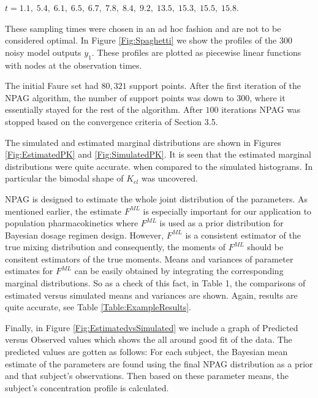 
$t = 1.1, \; 5.4, \; 6.1, \; 6.5, \; 6.7,\;  7.8, \; 8.4,  \; 9.2,\; 13.5,\; 15.3,\; 15.5,\; 15.8$.  
%

\noindent These sampling times were chosen in an ad hoc fashion and are not to be considered optimal.
In Figure  \ref{Fig:Spaghetti} we show the profiles of the 300 noisy model outputs $y_1$.
%
These profiles are plotted as piecewise linear functions with nodes at the observation times.  
%

The initial Faure set had $80,321$  support points. After the first  iteration of the NPAG  algorithm, the number of support points was down to $300$, where it essentially stayed for the rest of the algorithm. 
After $100$ iterations NPAG was stopped based on the convergence criteria of Section 3.5.%

The simulated and estimated  marginal distributions are shown in Figures  \ref{Fig:EstimatedPK} and \ref{Fig:SimulatedPK}.
It is seen that the estimated marginal distributions were quite accurate.
when compared to the simulated histograms. 
In particular the bimodal shape of $K_{el}$ was uncovered. 


NPAG is designed to estimate the whole joint distribution of the parameters. 
%
As mentioned earlier, the estimate $F^{ML}$ is especially important for our application to population pharmacokinetics where  $F^{ML}$ is used as a prior distribution for Bayesian dosage regimen design.
However, $F^{ML}$ is a consistent estimator of the true mixing distribution and consequently, the moments of $F^{ML}$  should be consitent estimators of the true moments. Means and variances of parameter estimates for $F^{ML}$
can be easily obtained by integrating the corresponding marginal distributions.
So as a check of this fact, in  Table 1, the  comparisons of estimated versus simulated means and variances are shown. Again, results are quite accurate, see Table
\ref{Table:ExampleResults}.


Finally, in Figure \ref{Fig:EstimatedvsSimulated} we include a graph of Predicted versus Observed values which shows the all around good fit of the data. The predicted values are gotten as follows: For each subject, the Bayesian mean estimate of the parameters are found using the final NPAG distribution as a prior and that subject's observations. Then based on these parameter means, the subject's concentration profile is calculated.





